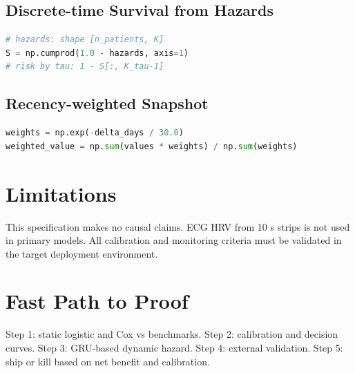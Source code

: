 \documentclass[11pt]{article}
\begin{document}
\subsection*{Discrete-time Survival from Hazards}
\begin{lstlisting}[language=Python,caption={From interval hazards to survival and risk}]
# hazards: shape [n_patients, K]
S = np.cumprod(1.0 - hazards, axis=1)
# risk by tau: 1 - S[:, K_tau-1]
\end{lstlisting}

\subsection*{Recency-weighted Snapshot}
\begin{lstlisting}[language=Python,caption={Recency weighting within window}]
weights = np.exp(-delta_days / 30.0)
weighted_value = np.sum(values * weights) / np.sum(weights)
\end{lstlisting}

\section{Limitations}
This specification makes no causal claims. ECG HRV from 10 s strips is not used in primary models. All calibration and monitoring criteria must be validated in the target deployment environment.

\section{Fast Path to Proof}
Step 1: static logistic and Cox vs benchmarks. Step 2: calibration and decision curves. Step 3: GRU-based dynamic hazard. Step 4: external validation. Step 5: ship or kill based on net benefit and calibration.
\end{document}
